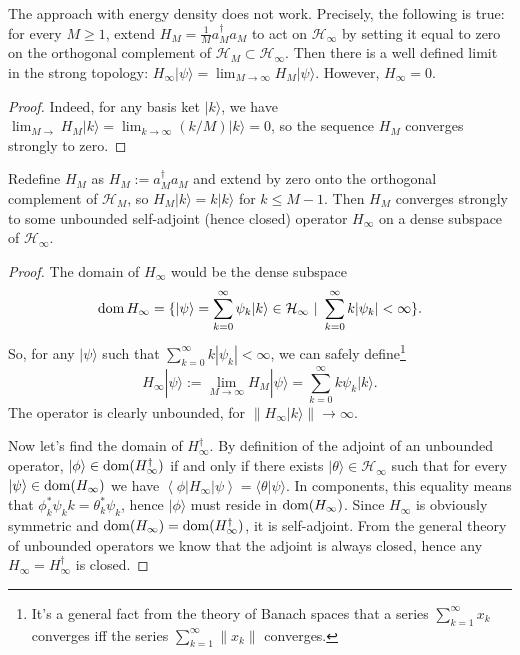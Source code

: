 	\begin{statement}
	The approach with energy density does not work. Precisely, the following is true: for every $M \geq 1$, extend $H_M = \frac{1}{M} a_M^\dagger a_M$ to act on $\mathcal{H}_\infty$ by setting it equal to zero on the orthogonal complement of $\mathcal H_{M} \subset \mathcal H_{\infty}$. Then there is a well defined limit in the strong topology: $H_{\infty}|\psi \rangle = \lim_{M \rightarrow \infty} H_{M}|\psi \rangle$. However, $H_{\infty} = 0$.
	\end{statement}
	\begin{proof}
	Indeed, for any basis ket $|k\rangle$, we have $\lim_{M \rightarrow} H_M|k\rangle = \lim_{k \rightarrow \infty}(k/M)|k\rangle = 0$, so the sequence $H_M$ converges strongly to zero.
	\end{proof}
	\begin{statement}
	Redefine $H_M$ as $H_M := a_M^\dagger a_M$ and extend by zero onto the orthogonal complement of $\mathcal H_{M}$, so $H_M |k \rangle = k |k\rangle$ for $k \leq M-1$. Then $H_M$ converges strongly to some unbounded self-adjoint (hence closed) operator $H_{\infty}$ on a dense subspace of $\mathcal H_{\infty}$.
	\end{statement}
	\begin{proof}
The domain of $H_{\infty}$ would be the dense subspace
\[
\operatorname{dom} H_{\infty} = \{ |\psi\rangle = \sum_{k=0}^\infty \psi_k |k \rangle \in \mathcal H_{\infty} \ | \ \sum_{k=0}^\infty k |\psi_k| < \infty \}.
\]
So, for any $|\psi\rangle$ such that $\sum_{k=0}^\infty k |\psi_k| < \infty$, we can safely define\footnote{It's a general fact from the theory of Banach spaces that a series $\sum_{k=1}^\infty x_k$ converges iff the series $\sum_{k=1}^\infty \|x_k\|$ converges.}
\[
H_{\infty}|\psi \rangle :=\lim_{M \rightarrow \infty} H_{M}|\psi \rangle = \sum_{k=0}^\infty k\psi_k |k \rangle.
\]
The operator is clearly unbounded, for $\|H_{\infty}|k\rangle\| \rightarrow \infty$.

Now let's find the domain of $H_{\infty}^\dagger$. By definition of the adjoint of an unbounded operator, $|\phi \rangle \in \operatorname{dom} (H_{\infty}^\dagger)$ if and only if there exists $|\theta\rangle \in \mathcal H_{\infty}$ such that for every $|\psi \rangle \in \operatorname{dom}(H_{\infty})$ we have $\left\langle \phi | H_{\infty} | \psi \right\rangle = \langle \theta | \psi \rangle$. In components, this equality means that $\phi_k^* \psi_k k = \theta_k^* \psi_k$, hence $|\phi\rangle$ must reside in $\operatorname{dom}(H_\infty)$. Since $H_{\infty}$ is obviously symmetric and $\operatorname{dom}(H_{\infty}) = \operatorname{dom}(H_{\infty}^\dagger)$, it is self-adjoint. From the general theory of unbounded operators we know that the adjoint is always closed, hence any $H_{\infty} = H_{\infty}^\dagger$ is closed.
	\end{proof}
	
